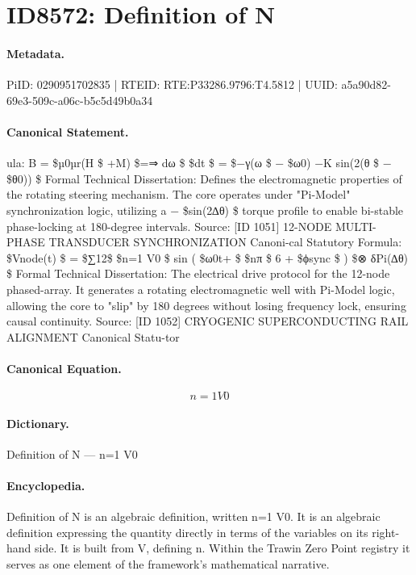 \section*{ID8572: Definition of N}
\paragraph{Metadata.}
PiID: 0290951702835 | RTEID: RTE:P33286.9796:T4.5812 | UUID: a5a90d82-69e3-509c-a06c-b5c5d49b0a34

\paragraph{Canonical Statement.}
ula: B = \$µ0µr(H \$ +M) \$=⇒ dω \$ \$dt \$ = \$−γ(ω \$ − \$ω0) −K sin(2(θ \$ − \$θ0)) \$ Formal Technical Dissertation: Defines the electromagnetic properties of the rotating steering mechanism. The core operates under "Pi-Model" synchronization logic, utilizing a − \$sin(2∆θ) \$ torque profile to enable bi-stable phase-locking at 180-degree intervals. Source: [ID 1051] 12-NODE MULTI-PHASE TRANSDUCER SYNCHRONIZATION Canoni-cal Statutory Formula: \$Vnode(t) \$ = \$∑12\$ \$n=1 V0 \$ sin ( \$ω0t+ \$ \$nπ \$ 6 + \$ϕsync \$ ) \$⊗ δPi(∆θ) \$ Formal Technical Dissertation: The electrical drive protocol for the 12-node phased-array. It generates a rotating electromagnetic well with Pi-Model logic, allowing the core to "slip" by 180 degrees without losing frequency lock, ensuring causal continuity. Source: [ID 1052] CRYOGENIC SUPERCONDUCTING RAIL ALIGNMENT Canonical Statu-tor

\paragraph{Canonical Equation.}
\[
n=1 V0
\]

\paragraph{Dictionary.}
Definition of N — n=1 V0

\paragraph{Encyclopedia.}
Definition of N is an algebraic definition, written n=1 V0. It is an algebraic definition expressing the quantity directly in terms of the variables on its right-hand side. It is built from V, defining n. Within the Trawin Zero Point registry it serves as one element of the framework's mathematical narrative.
